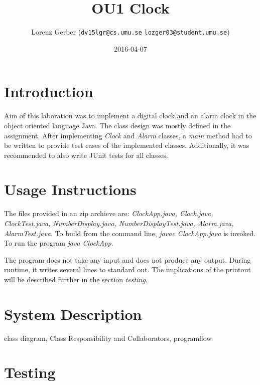 \documentclass[a4paper,11pt,twoside]{article}
\title{OU1 Clock}
\author{Lorenz Gerber ({\tt{dv15lgr@cs.umu.se}} {\tt{lozger03@student.umu.se}})}
\date{2016-04-07}
\begin{document}
\lstset{language=C}
\maketitle
\thispagestyle{empty}
\newpage
\tableofcontents
\thispagestyle{empty}
\newpage

\clearpage
{}

\section{Introduction} 
Aim of this laboration was to implement a digital clock and an alarm
clock in the object oriented language Java. The class design was
mostly defined in the assignment. After implementing \textit{Clock}
and \textit{Alarm} classes, a \textit{main} method had to be written
to provide test cases of the implemented classes. Additionally, it was
recommended to also write JUnit tests for all classes. 

\section{Usage Instructions}
The files provided in an zip archieve are: \textit{ClockApp.java,
  Clock.java, ClockTest.java, NumberDisplay.java,
  NumberDisplayTest.java, Alarm.java, AlarmTest.java}. To build from
the command line, \textit{javac ClockApp.java} is invoked. To run the
program \textit{java ClockApp}.

The program does not take any input and does not produce any
output. During runtime, it writes several lines to standard out. The
implications of the printout will be described further in the section 
\textit{testing}.

\section{System Description}
class diagram, Class Responsibility and Collaborators, programflow

\section{Testing}
\end{document}
